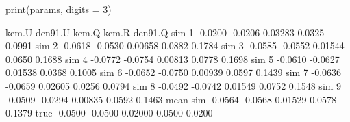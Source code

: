 \begin{Schunk}
\begin{Sinput}
 print(params, digits = 3)
\end{Sinput}
\begin{Soutput}
           kem.U den91.U   kem.Q  kem.R den91.Q
sim 1    -0.0200 -0.0206 0.03283 0.0325  0.0991
sim 2    -0.0618 -0.0530 0.00658 0.0882  0.1784
sim 3    -0.0585 -0.0552 0.01544 0.0650  0.1688
sim 4    -0.0772 -0.0754 0.00813 0.0778  0.1698
sim 5    -0.0610 -0.0627 0.01538 0.0368  0.1005
sim 6    -0.0652 -0.0750 0.00939 0.0597  0.1439
sim 7    -0.0636 -0.0659 0.02605 0.0256  0.0794
sim 8    -0.0492 -0.0742 0.01549 0.0752  0.1548
sim 9    -0.0509 -0.0294 0.00835 0.0592  0.1463
mean sim -0.0564 -0.0568 0.01529 0.0578  0.1379
true     -0.0500 -0.0500 0.02000 0.0500  0.0200
\end{Soutput}
\end{Schunk}
